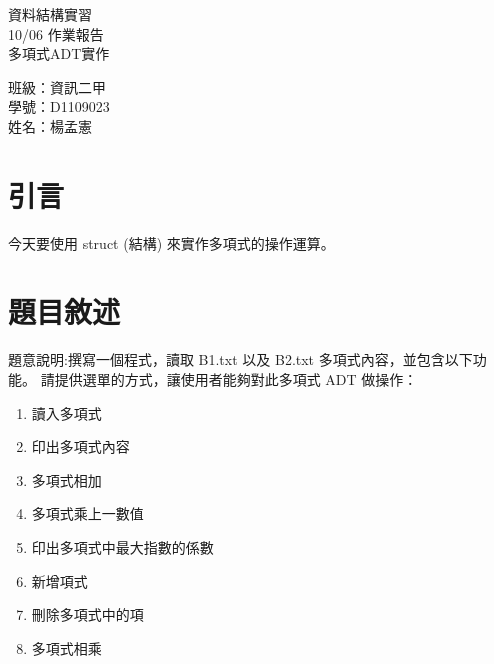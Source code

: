 \documentclass[12pt, a4paper]{article}
\begin{document}
  \begin{center}
    {\Huge 資料結構實習} \\[2.5cm]
    {\Huge 10/06 作業報告} \\[1.5cm]
    {\Huge 多項式ADT實作} \\ [4.5cm]
    \hspace{.6in}
    \begin{minipage}[t]{.4\linewidth}
      {\Large 班級：資訊二甲}\\[0.5cm]
      {\Large 學號：D1109023}\\[0.5cm]
      {\Large 姓名：楊孟憲}
    \end{minipage}    
  \end{center}

  \newpage

  \begin{samepage}
    \fontsize{18pt}{20pt} \selectfont  
    \tableofcontents
    \normalfont
  \end{samepage}
  
  \newpage


  \section{\fontsize{20pt}{22pt}\selectfont 引言}
  \begin{samepage}
    \fontsize{16pt}{18pt} \selectfont
    今天要使用 struct (結構) 來實作多項式的操作運算。
    
  \end{samepage}


  \section{\fontsize{20pt}{22pt}\selectfont 題目敘述}
  \begin{samepage}
    \fontsize{16pt}{18pt} \selectfont
        題意說明:撰寫一個程式，讀取 B1.txt 以及 B2.txt 多項式內容，並包含以下功能。
        請提供選單的方式，讓使用者能夠對此多項式 ADT 做操作：
        \begin{enumerate}
            \fontsize{14pt}{16pt} \selectfont
            \item 讀入多項式
            \item 印出多項式內容
            \item 多項式相加
            \item 多項式乘上一數值
            \item 印出多項式中最大指數的係數
            \item 新增項式
            \item 刪除多項式中的項
            \item 多項式相乘
        \end{enumerate}
  \end{samepage}
\end{document}
